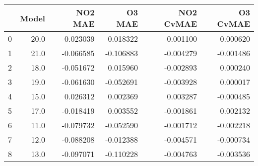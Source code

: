 \begin{tabular}{lrrrrr}
\toprule
{} &  Model &   NO2 MAE &    O3 MAE &  NO2 CvMAE &  O3 CvMAE \\
\midrule
0 &   20.0 & -0.023039 &  0.018322 &  -0.001100 &  0.000620 \\
1 &   21.0 & -0.066585 & -0.106883 &  -0.004279 & -0.001486 \\
2 &   18.0 & -0.051672 &  0.015960 &  -0.002893 &  0.000240 \\
3 &   19.0 & -0.061630 & -0.052691 &  -0.003928 &  0.000017 \\
4 &   15.0 &  0.026312 &  0.002369 &   0.003287 & -0.000485 \\
5 &   17.0 & -0.018419 &  0.003552 &  -0.001861 &  0.002132 \\
6 &   11.0 & -0.079732 & -0.052590 &  -0.001712 & -0.002218 \\
7 &   12.0 & -0.088208 & -0.012388 &  -0.004571 & -0.000734 \\
8 &   13.0 & -0.097071 & -0.110228 &  -0.004763 & -0.003536 \\
\bottomrule
\end{tabular}
